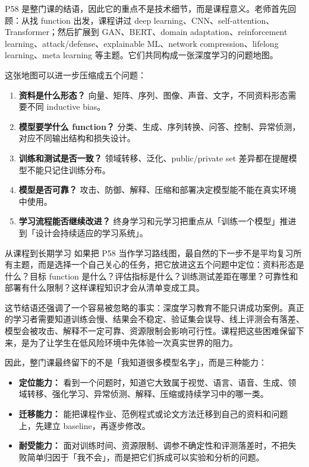 \documentclass[a4paper]{article}
\begin{document}
P58 是整门课的结语，因此它的重点不是技术细节，而是课程意义。老师首先回顾：从找 function 出发，课程讲过 deep learning、CNN、self-attention、Transformer；然后扩展到 GAN、BERT、domain adaptation、reinforcement learning、attack/defense、explainable ML、network compression、lifelong learning、meta learning 等主题。它们共同构成一张深度学习的问题地图。

这张地图可以进一步压缩成五个问题：
\begin{enumerate}
    \item \textbf{资料是什么形态？} 向量、矩阵、序列、图像、声音、文字，不同资料形态需要不同 inductive bias。
    \item \textbf{模型要学什么 function？} 分类、生成、序列转换、问答、控制、异常侦测，对应不同输出结构和损失设计。
    \item \textbf{训练和测试是否一致？} 领域转移、泛化、public/private set 差异都在提醒模型不能只记住训练分布。
    \item \textbf{模型是否可靠？} 攻击、防御、解释、压缩和部署决定模型能不能在真实环境中使用。
    \item \textbf{学习流程能否继续改进？} 终身学习和元学习把重点从「训练一个模型」推进到「设计会持续适应的学习系统」。
\end{enumerate}

\begin{knowledgebox}{从课程到长期学习}
    如果把 P58 当作学习路线图，最自然的下一步不是平均复习所有主题，而是选择一个自己关心的任务，把它放进这五个问题中定位：资料形态是什么？目标 function 是什么？评估指标是什么？训练测试差距在哪里？可靠性和部署有什么限制？这样课程知识才会从清单变成工具。
\end{knowledgebox}

这节结语还强调了一个容易被忽略的事实：深度学习教育不能只讲成功案例。真正的学习者需要知道训练会慢、结果会不稳定、验证集会误导、线上评测会有落差、模型会被攻击、解释不一定可靠、资源限制会影响可行性。课程把这些困难保留下来，是为了让学生在低风险环境中先体验一次真实世界的阻力。

因此，整门课最终留下的不是「我知道很多模型名字」，而是三种能力：
\begin{itemize}
    \item \textbf{定位能力：} 看到一个问题时，知道它大致属于视觉、语言、语音、生成、领域转移、强化学习、异常侦测、解释、压缩或持续学习中的哪一类。
    \item \textbf{迁移能力：} 能把课程作业、范例程式或论文方法迁移到自己的资料和问题上，先建立 baseline，再逐步修改。
    \item \textbf{耐受能力：} 面对训练时间、资源限制、调参不确定性和评测落差时，不把失败简单归因于「我不会」，而是把它们拆成可以实验和分析的问题。
\end{itemize}
\end{document}
